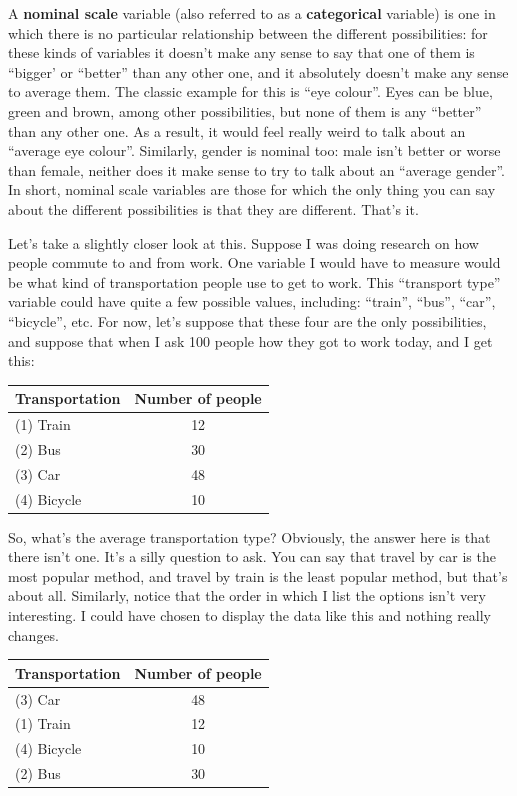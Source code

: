 \documentclass[]{book}
\begin{document}
A \textbf{nominal scale} variable (also referred to as a \textbf{categorical} variable) is one in which there is no particular relationship between the different possibilities: for these kinds of variables it doesn't make any sense to say that one of them is ``bigger' or ``better'' than any other one, and it absolutely doesn't make any sense to average them. The classic example for this is ``eye colour''. Eyes can be blue, green and brown, among other possibilities, but none of them is any ``better'' than any other one. As a result, it would feel really weird to talk about an ``average eye colour''. Similarly, gender is nominal too: male isn't better or worse than female, neither does it make sense to try to talk about an ``average gender''. In short, nominal scale variables are those for which the only thing you can say about the different possibilities is that they are different. That's it.

Let's take a slightly closer look at this. Suppose I was doing research on how people commute to and from work. One variable I would have to measure would be what kind of transportation people use to get to work. This ``transport type'' variable could have quite a few possible values, including: ``train'', ``bus'', ``car'', ``bicycle'', etc. For now, let's suppose that these four are the only possibilities, and suppose that when I ask 100 people how they got to work today, and I get this:

\begin{longtable}[]{@{}lc@{}}
\toprule
Transportation & Number of people\tabularnewline
\midrule
\endhead
(1) Train & 12\tabularnewline
(2) Bus & 30\tabularnewline
(3) Car & 48\tabularnewline
(4) Bicycle & 10\tabularnewline
\bottomrule
\end{longtable}

So, what's the average transportation type? Obviously, the answer here is that there isn't one. It's a silly question to ask. You can say that travel by car is the most popular method, and travel by train is the least popular method, but that's about all. Similarly, notice that the order in which I list the options isn't very interesting. I could have chosen to display the data like this and nothing really changes.

\begin{longtable}[]{@{}lc@{}}
\toprule
Transportation & Number of people\tabularnewline
\midrule
\endhead
(3) Car & 48\tabularnewline
(1) Train & 12\tabularnewline
(4) Bicycle & 10\tabularnewline
(2) Bus & 30\tabularnewline
\bottomrule
\end{longtable}
\end{document}
